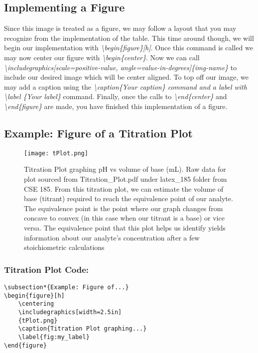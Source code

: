 \documentclass[12pt,journal,compsoc]{IEEEtran}
\begin{document}
\subsection{Implementing a Figure}
Since this image is treated as a figure, we may follow a layout that you may recognize from the implementation of the table. This time around though, we will begin our implementation with \emph{\textbackslash begin\{figure\}[h]}. Once this command is called we may now center our figure with \emph{\textbackslash begin\{center\}}. Now we can call \emph{\textbackslash includegraphics[scale=positive-value, angle=value-in-degrees]\{img-name\}} to include our desired image which will be center aligned. To top off our image, we may add a caption using the \emph{\textbackslash caption\{Your caption\} \emph{command and a label with} \textbackslash label \{Your label\}} command. Finally, once the calls to  \emph{\textbackslash end\{center\}} and \emph{\textbackslash end\{figure\}} are made, you have finished this implementation of a figure.

\subsection*{Example: Figure of a Titration Plot}
\begin{figure}[h]
    \centering
    \texttt{[image: tPlot.png]}
    \caption{Titration Plot graphing pH vs volume of base (mL). Raw data for plot sourced from Titration\_Plot.pdf under latex\_185 folder from CSE 185. From this titration plot, we can estimate the volume of base (titrant) required to reach the equivalence point of our analyte. The equivalence point is the point where our graph changes from concave to convex (in this case when our titrant is a base) or vice versa. The equivalence point that this plot helps us identify yields information about our analyte's concentration after a few stoichiometric calculations}
    \label{fig:my_label}
\end{figure}

\subsubsection*{Titration Plot Code:}
{\small
\begin{center}
\begin{verbatim}
\subsection*{Example: Figure of...}
\begin{figure}[h]
    \centering
    \includegraphics[width=2.5in]
    {tPlot.png}
    \caption{Titration Plot graphing...}
    \label{fig:my_label}
\end{figure}
\end{verbatim}
\end{center}}
\end{document}

